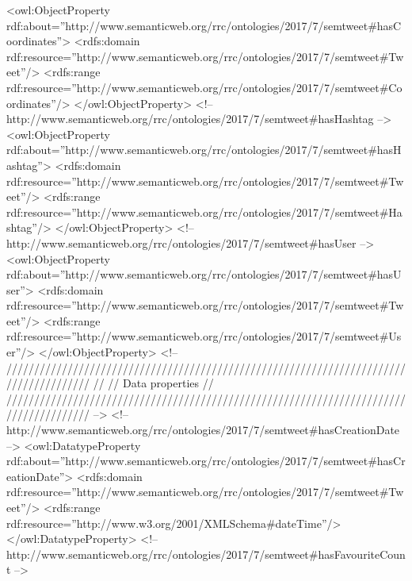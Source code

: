 \begin{listing}[
  language = XML,
  numbers=left,
  numberstyle=\tiny,
  stepnumber=5,
  numbersep=5pt,
  frame=single,
  caption  = {Ontología de tweets: Ontotwitter},
  label    = code:ontotwitter]
    <owl:ObjectProperty
    rdf:about=''http://www.semanticweb.org/rrc/ontologies/2017/7/semtweet#hasCoordinates''>
        <rdfs:domain
        rdf:resource=''http://www.semanticweb.org/rrc/ontologies/2017/7/semtweet#Tweet''/>
        <rdfs:range
        rdf:resource=''http://www.semanticweb.org/rrc/ontologies/2017/7/semtweet#Coordinates''/>
    </owl:ObjectProperty>
    <!-- http://www.semanticweb.org/rrc/ontologies/2017/7/semtweet#hasHashtag
    -->
    <owl:ObjectProperty
    rdf:about=''http://www.semanticweb.org/rrc/ontologies/2017/7/semtweet#hasHashtag''>
        <rdfs:domain
        rdf:resource=''http://www.semanticweb.org/rrc/ontologies/2017/7/semtweet#Tweet''/>
        <rdfs:range
        rdf:resource=''http://www.semanticweb.org/rrc/ontologies/2017/7/semtweet#Hashtag''/>
    </owl:ObjectProperty>
    <!-- http://www.semanticweb.org/rrc/ontologies/2017/7/semtweet#hasUser -->
    <owl:ObjectProperty
    rdf:about=''http://www.semanticweb.org/rrc/ontologies/2017/7/semtweet#hasUser''>
        <rdfs:domain
        rdf:resource=''http://www.semanticweb.org/rrc/ontologies/2017/7/semtweet#Tweet''/>
        <rdfs:range
        rdf:resource=''http://www.semanticweb.org/rrc/ontologies/2017/7/semtweet#User''/>
    </owl:ObjectProperty>
    <!-- 
    ///////////////////////////////////////////////////////////////////////////////////////
    //
    // Data properties
    //
    ///////////////////////////////////////////////////////////////////////////////////////
     -->
    <!--
    http://www.semanticweb.org/rrc/ontologies/2017/7/semtweet#hasCreationDate
    -->
    <owl:DatatypeProperty
    rdf:about=''http://www.semanticweb.org/rrc/ontologies/2017/7/semtweet#hasCreationDate''>
        <rdfs:domain
        rdf:resource=''http://www.semanticweb.org/rrc/ontologies/2017/7/semtweet#Tweet''/>
        <rdfs:range rdf:resource=''http://www.w3.org/2001/XMLSchema#dateTime''/>
    </owl:DatatypeProperty>
    <!--
    http://www.semanticweb.org/rrc/ontologies/2017/7/semtweet#hasFavouriteCount
    -->


\end{listing}
